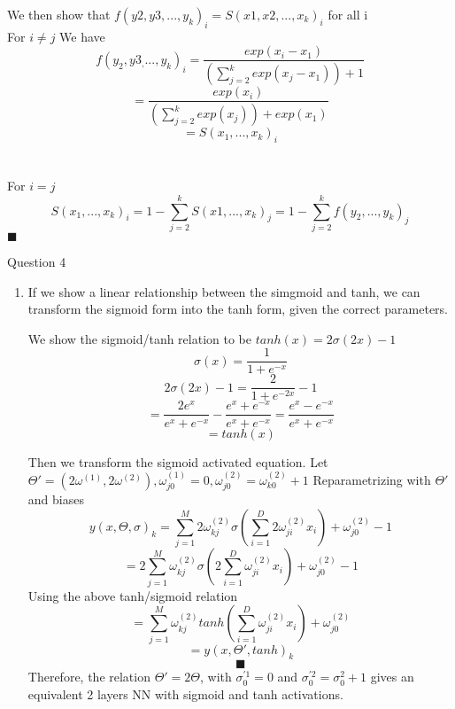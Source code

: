 \documentclass{article}
\begin{document}
\begin{enumerate}
We then show that   $f(y2,y3,...,y_k)_i = S(x1,x2, ... , x_k)_i$ for all i\\

For $ i \neq j$ We have $$ f(y_2,y3_,...,y_k)_i = \frac{exp(x_i - x_1)}{(\sum^k_{j=2} exp(x_j - x_1)) + 1}$$ $$ = \frac{exp(x_i)}{(\sum^k_{j=2} exp(x_j)) + exp(x_1)}$$ $$= S(x_1, ..., x_k)_i$$\\ \\

For $ i = j$ $$ S(x_1, ..., x_k)_i = 1 - \sum^k_{j=2} S(x1, ..., x_k)_j = 1 - \sum^k_{j=2} f(y_2, ..., y_k)_j $$
	$\blacksquare$
    \vspace{0.5cm}
\end{enumerate}


\vspace{1cm}
 Question 4 \\

  \begin{enumerate}

  \item 
	If we show a linear relationship between the simgmoid and tanh, we can transform the sigmoid form into the tanh form, given the correct parameters.

	We show the sigmoid/tanh relation to be $tanh(x) = 2\sigma(2x) - 1$ $$ \sigma(x) = \frac{1}{1 + e^{-x}}$$ $$ 2 \sigma(2x) - 1 = \frac{2}{1 + e^{-2x}} -1$$ $$ = \frac{2e^{x}}{e^x + e^{-x}} - \frac{e^x + e^{-x}}{e^x + e^{-x}} = \frac{e^x - e^{-x}}{e^x + e^{-x}}$$ $$ = tanh(x)$$


	Then we transform the sigmoid activated equation. Let $\Theta' = (2\omega^{(1)}, 2\omega^{(2)}), \omega^{(1)}_{j0} = 0,  \omega^{(2)}_{j0} = \omega^{(2)}_{k0} + 1$ 		           Reparametrizing with $\Theta'$ and biases  $$ y(x,\Theta,\sigma)_k =\sum^M_{j=1} 2\omega^{(2)}_{kj} \sigma (\sum^D_{i=1} 2\omega^{(2)}_{ji}x_i) +  \omega^{(2)}				_{j0} - 1$$ $$ =2\sum^M_{j=1} \omega^{(2)}_{kj} \sigma (2\sum^D_{i=1} \omega^{(2)}_{ji}x_i) +  \omega^{(2)}_{j0} - 1$$ Using the above tanh/sigmoid relation
	 $$ =\sum^M_{j=1} \omega^{(2)}_{kj} tanh (\sum^D_{i=1} \omega^{(2)}_{ji}x_i) +  \omega^{(2)}_{j0} $$ $$ = y(x,\Theta',tanh)_k$$
	$$\blacksquare$$
	Therefore, the relation $\Theta' = 2\Theta$, with $\sigma^{'1}_0 = 0$ and $\sigma^{'2}_0 =  \sigma^2_0 + 1$ gives an equivalent 2 layers NN with sigmoid and tanh activations.
	

    \vspace{0.5cm}

  \end{enumerate}
\end{document}
